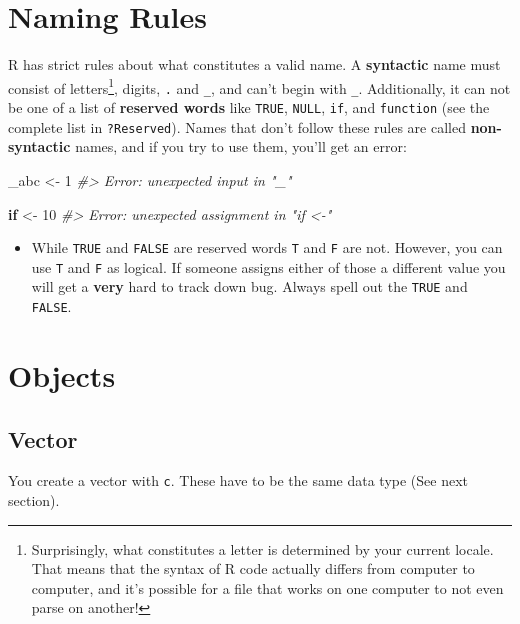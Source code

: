 \documentclass[]{book}
\newenvironment{Shaded}{\begin{snugshade}}{\end{snugshade}}
\newcommand{\DecValTok}[1]{\textcolor[rgb]{0.00,0.00,0.81}{#1}}
\newcommand{\StringTok}[1]{\textcolor[rgb]{0.31,0.60,0.02}{#1}}
\newcommand{\CommentTok}[1]{\textcolor[rgb]{0.56,0.35,0.01}{\textit{#1}}}
\newcommand{\ControlFlowTok}[1]{\textcolor[rgb]{0.13,0.29,0.53}{\textbf{#1}}}
\newcommand{\NormalTok}[1]{#1}
\let\rmarkdownfootnote\footnote%
\def\footnote{\protect\rmarkdownfootnote}
\newenvironment{rmdblock}[1]
  {\begin{shaded*}
  \begin{itemize}
  \renewcommand{\labelitemi}{
    \raisebox{-.7\height}[0pt][0pt]{
      {\setkeys{Gin}{width=3em,keepaspectratio}\texttt{[image: images/\#1]}}
    }
  }
  \item
  }
  {
  \end{itemize}
  \end{shaded*}
  }
\newenvironment{rmdwarning}
  {\begin{rmdblock}{warning}}
  {\end{rmdblock}}
\begin{document}
\section{Naming Rules}\label{naming-rules}

R has strict rules about what constitutes a valid name. A
\textbf{syntactic} name must consist of letters\footnote{Surprisingly,
  what constitutes a letter is determined by your current locale. That
  means that the syntax of R code actually differs from computer to
  computer, and it's possible for a file that works on one computer to
  not even parse on another!}, digits, \texttt{.} and \texttt{\_}, and
can't begin with \texttt{\_}. Additionally, it can not be one of a list
of \textbf{reserved words} like \texttt{TRUE}, \texttt{NULL},
\texttt{if}, and \texttt{function} (see the complete list in
\texttt{?Reserved}). Names that don't follow these rules are called
\textbf{non-syntactic} names, and if you try to use them, you'll get an
error:

\begin{Shaded}
\begin{Highlighting}[]
\NormalTok{_abc <-}\StringTok{ }\DecValTok{1}
\CommentTok{#> Error: unexpected input in "_"}

\ControlFlowTok{if}\NormalTok{ <-}\StringTok{ }\DecValTok{10}
\CommentTok{#> Error: unexpected assignment in "if <-"}
\end{Highlighting}
\end{Shaded}

\begin{rmdwarning}
While \texttt{TRUE} and \texttt{FALSE} are reserved words \texttt{T} and
\texttt{F} are not. However, you can use \texttt{T} and \texttt{F} as
logical. If someone assigns either of those a different value you will
get a \textbf{very} hard to track down bug. Always spell out the
\texttt{TRUE} and \texttt{FALSE}.
\end{rmdwarning}

\section{Objects}\label{objects}

\subsection{Vector}\label{vector}

You create a vector with \texttt{c}. These have to be the same data type
(See next section).
\end{document}
